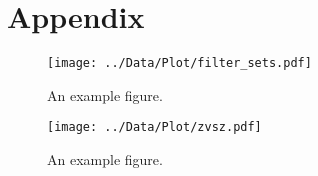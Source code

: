 \chapter{Appendix}





\begin{figure}
\centering
\texttt{[image: ../Data/Plot/filter\_sets.pdf]}
\caption{An example figure.}
\label{filter_sets}
\end{figure}

\begin{figure}
\centering
\texttt{[image: ../Data/Plot/zvsz.pdf]}
\caption{An example figure.}
\label{zvsz}
\end{figure}

